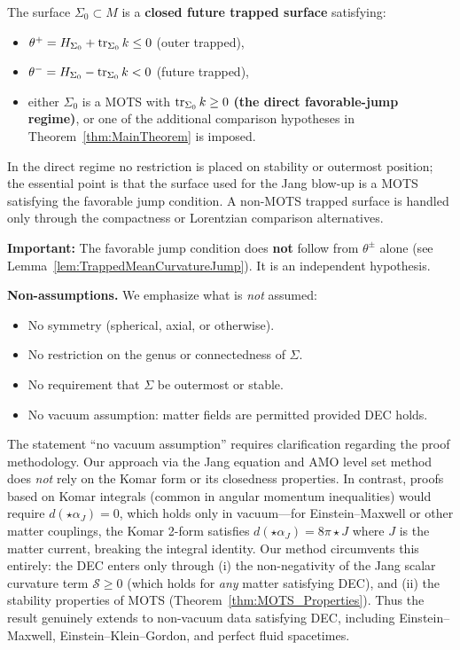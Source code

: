 \begin{assumption}\label{ass:trapped}
The surface $\Sigma_0 \subset M$ is a \textbf{closed future trapped surface} satisfying:
\begin{itemize}
    \item $\theta^+ = H_{\Sigma_0} + \operatorname{tr}_{\Sigma_0} k \le 0$ (outer trapped),
    \item $\theta^- = H_{\Sigma_0} - \operatorname{tr}_{\Sigma_0} k < 0$ (future trapped),
    \item either $\Sigma_0$ is a MOTS with $\operatorname{tr}_{\Sigma_0} k \ge 0$ \textbf{(the direct favorable-jump regime)}, or one of the additional comparison hypotheses in Theorem~\ref{thm:MainTheorem} is imposed.
\end{itemize}
In the direct regime no restriction is placed on stability or outermost position; the essential point is that the surface used for the Jang blow-up is a MOTS satisfying the favorable jump condition. A non-MOTS trapped surface is handled only through the compactness or Lorentzian comparison alternatives.

\textbf{Important:} The favorable jump condition does \textbf{not} follow from $\theta^\pm$ alone (see Lemma~\ref{lem:TrappedMeanCurvatureJump}). It is an independent hypothesis.
\end{assumption}

\noindent\textbf{Non-assumptions.} We emphasize what is \emph{not} assumed:
\begin{itemize}
    \item No symmetry (spherical, axial, or otherwise).
    \item No restriction on the genus or connectedness of $\Sigma$.
    \item No requirement that $\Sigma$ be outermost or stable.
    \item No vacuum assumption: matter fields are permitted provided DEC holds.
\end{itemize}

\begin{remark}\label{rem:VacuumFreeScope}
The statement ``no vacuum assumption'' requires clarification regarding the proof methodology. Our approach via the Jang equation and AMO level set method does \emph{not} rely on the Komar form or its closedness properties. In contrast, proofs based on Komar integrals (common in angular momentum inequalities) would require $d(\star \alpha_J) = 0$, which holds only in vacuum---for Einstein--Maxwell or other matter couplings, the Komar 2-form satisfies $d(\star \alpha_J) = 8\pi \star J$ where $J$ is the matter current, breaking the integral identity. Our method circumvents this entirely: the DEC enters only through (i) the non-negativity of the Jang scalar curvature term $\mathcal{S} \geq 0$ (which holds for \emph{any} matter satisfying DEC), and (ii) the stability properties of MOTS (Theorem~\ref{thm:MOTS_Properties}). Thus the result genuinely extends to non-vacuum data satisfying DEC, including Einstein--Maxwell, Einstein--Klein--Gordon, and perfect fluid spacetimes.
\end{remark}

